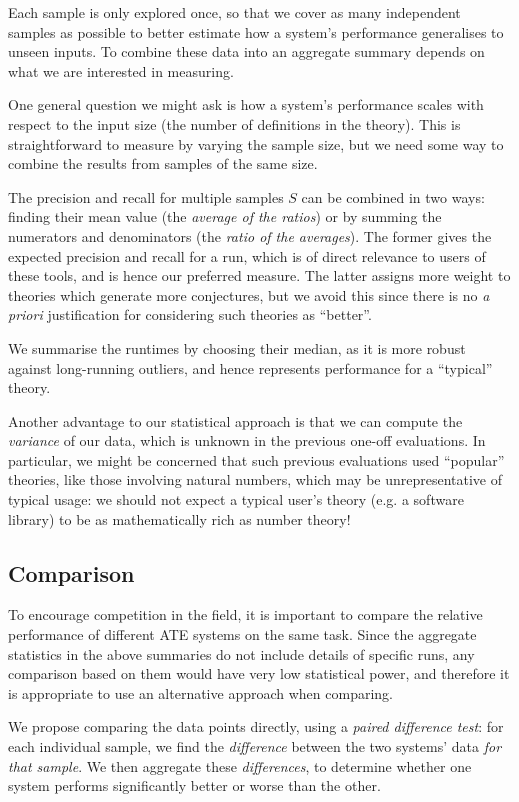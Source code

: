 Each sample is only explored once, so that we cover as many independent samples
as possible to better estimate how a system's performance generalises to unseen
inputs. To combine these data into an aggregate summary depends on what we are
interested in measuring.

One general question we might ask is how a system's performance scales with
respect to the input size (the number of definitions in the theory). This is
straightforward to measure by varying the sample size, but we need some way to
combine the results from samples of the same size.

The precision and recall for multiple samples $S$ can be combined in two ways:
finding their mean value (the \emph{average of the ratios}) or by summing the
numerators and denominators (the \emph{ratio of the averages}). The former gives
the expected precision and recall for a run, which is of direct relevance to
users of these tools, and is hence our preferred measure. The latter assigns
more weight to theories which generate more conjectures, but we avoid this since
there is no \emph{a priori} justification for considering such theories as
``better''.

We summarise the runtimes by choosing their median, as it is more robust against
long-running outliers, and hence represents performance for a ``typical''
theory.

Another advantage to our statistical approach is that we can compute the
\emph{variance} of our data, which is unknown in the previous one-off
evaluations. In particular, we might be concerned that such previous evaluations
used ``popular'' theories, like those involving natural numbers, which may be
unrepresentative of typical usage: we should not expect a typical user's theory
(e.g. a software library) to be as mathematically rich as number theory!

\subsection{Comparison}

To encourage competition in the field, it is important to compare the relative
performance of different ATE systems on the same task. Since the aggregate
statistics in the above summaries do not include details of specific runs, any
comparison based on them would have very low statistical power, and therefore it
is appropriate to use an alternative approach when comparing.

We propose comparing the data points directly, using a \emph{paired difference
  test}: for each individual sample, we find the \emph{difference} between the
two systems' data \emph{for that sample}. We then aggregate these
\emph{differences}, to determine whether one system performs significantly
better or worse than the other.


